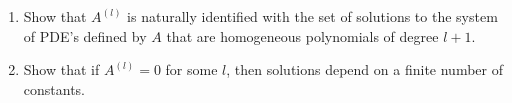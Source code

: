 \begin{xca}
    \begin{enumerate}
        \item Show that $A^{(l)}$ is naturally identified with the set of solutions to the system of PDE's defined by $A$ that are homogeneous polynomials of degree $l+1$.
        \item Show that if $A^{(l)}=0$ for some $l$, then solutions depend on a finite number of constants.
    \end{enumerate}
\end{xca}







